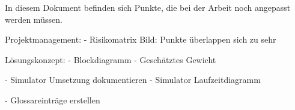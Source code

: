 
In diesem Dokument befinden sich Punkte, die bei der Arbeit noch angepasst werden müssen.

Projektmanagement:
- Risikomatrix Bild: Punkte überlappen sich zu sehr

Lösungskonzept:
- Blockdiagramm
- Geschätztes Gewicht

- Simulator Umsetzung dokumentieren
- Simulator Laufzeitdiagramm


- Glossareinträge erstellen